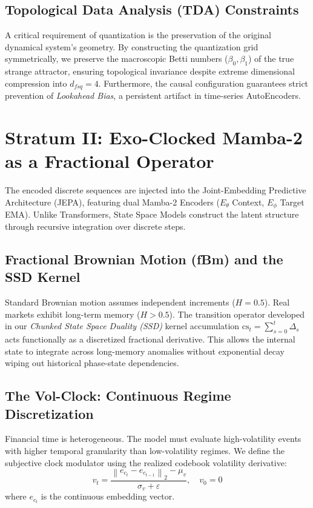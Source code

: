 \documentclass[11pt]{article}
\newcommand{\EPS}{\varepsilon}
\newcommand{\norm}[1]{\left\|#1\right\|}
\begin{document}
\subsection{Topological Data Analysis (TDA) Constraints}
A critical requirement of quantization is the preservation of the original dynamical system's geometry. By constructing the quantization grid symmetrically, we preserve the macroscopic Betti numbers ($\beta_0, \beta_1$) of the true strange attractor, ensuring topological invariance despite extreme dimensional compression into $d_{fsq}=4$. Furthermore, the causal configuration guarantees strict prevention of \textit{Lookahead Bias}, a persistent artifact in time-series AutoEncoders.

\section{Stratum II: Exo-Clocked Mamba-2 as a Fractional Operator}

The encoded discrete sequences are injected into the Joint-Embedding Predictive Architecture (JEPA), featuring dual Mamba-2 Encoders ($E_\theta$ Context, $E_\phi$ Target EMA). Unlike Transformers, State Space Models construct the latent structure through recursive integration over discrete steps.

\subsection{Fractional Brownian Motion (fBm) and the SSD Kernel}
Standard Brownian motion assumes independent increments ($H = 0.5$). Real markets exhibit long-term memory ($H > 0.5$). The transition operator developed in our \textit{Chunked State Space Duality (SSD)} kernel accumulation $\text{cs}_t = \sum_{s=0}^t \Delta_s$ acts functionally as a discretized fractional derivative. This allows the internal state to integrate across long-memory anomalies without exponential decay wiping out historical phase-state dependencies.

\subsection{The Vol-Clock: Continuous Regime Discretization}
Financial time is heterogeneous. The model must evaluate high-volatility events with higher temporal granularity than low-volatility regimes. We define the subjective clock modulator using the realized codebook volatility derivative:
\begin{equation}
  v_t = \frac{\norm{e_{c_t} - e_{c_{t-1}}}_2 - \mu_v}{\sigma_v + \EPS}, \quad v_0 = 0
\end{equation}
where $e_{c_t}$ is the continuous embedding vector. 
\end{document}
